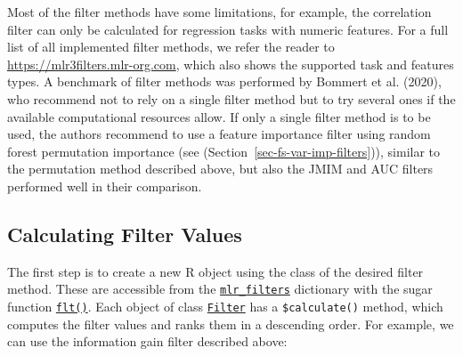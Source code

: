 Most of the filter methods have some limitations, for example, the
correlation filter can only be calculated for regression tasks with
numeric features. For a full list of all implemented filter methods, we
refer the reader to \url{https://mlr3filters.mlr-org.com}, which also
shows the supported task and features types. A benchmark of filter
methods was performed by Bommert et al. (2020), who recommend not to
rely on a single filter method but to try several ones if the available
computational resources allow. If only a single filter method is to be
used, the authors recommend to use a feature importance filter using
random forest permutation importance (see
(Section~\ref{sec-fs-var-imp-filters})), similar to the permutation
method described above, but also the JMIM and AUC filters performed well
in their comparison.

\hypertarget{sec-fs-calc}{%
\subsection{Calculating Filter Values}\label{sec-fs-calc}}

The first step is to create a new R object using the class of the
desired filter method. These are accessible from the
\href{https://mlr3filters.mlr-org.com/reference/mlr_filters.html}{\texttt{mlr\_filters}}
dictionary with the sugar function
\href{https://mlr3filters.mlr-org.com/reference/flt.html}{\texttt{flt()}}.
Each object of class
\href{https://www.rdocumentation.org/packages/base/topics/funprog}{\texttt{Filter}}
has a
\texttt{\$calculate()}
method, which computes the filter values and ranks them in a descending
order. For example, we can use the information gain filter described
above:

\begin{Shaded}
\begin{Highlighting}[]
\OtherTok{=} \NormalTok{(}\NormalTok{)}
\end{Highlighting}
\end{Shaded}

